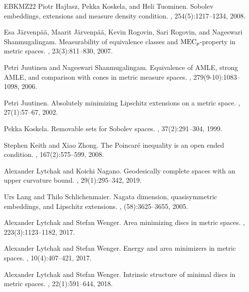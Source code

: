 \documentclass[reqno]{amsart}
\numberwithin{equation}{section}
\theoremstyle{remark}
\begin{document}
\begin{thebibliography}{EBKMZ22}
Piotr Haj\l{}asz, Pekka Koskela, and Heli Tuominen.
\newblock Sobolev embeddings, extensions and measure density condition.
, 254(5):1217--1234, 2008.

Esa J\"{a}rvenp\"{a}\"{a}, Maarit J\"{a}rvenp\"{a}\"{a}, Kevin Rogovin, Sari
  Rogovin, and Nageswari Shanmugalingam.
\newblock Measurability of equivalence classes and {${\rm MEC}_p$}-property in
  metric spaces.
, 23(3):811--830, 2007.

Petri Juutinen and Nageswari Shanmugalingam.
\newblock Equivalence of {AMLE}, strong {AMLE}, and comparison with cones in
  metric measure spaces.
, 279(9-10):1083--1098, 2006.

Petri Juutinen.
\newblock Absolutely minimizing {L}ipschitz extensions on a metric space.
, 27(1):57--67, 2002.

Pekka Koskela.
\newblock Removable sets for {S}obolev spaces.
, 37(2):291--304, 1999.

Stephen Keith and Xiao Zhong.
\newblock The {P}oincar\'{e} inequality is an open ended condition.
, 167(2):575--599, 2008.

Alexander Lytchak and Koichi Nagano.
\newblock Geodesically complete spaces with an upper curvature bound.
, 29(1):295--342, 2019.

Urs Lang and Thilo Schlichenmaier.
\newblock Nagata dimension, quasisymmetric embeddings, and {L}ipschitz
  extensions.
, (58):3625--3655, 2005.

Alexander Lytchak and Stefan Wenger.
\newblock Area minimizing discs in metric spaces.
, 223(3):1123--1182, 2017.

Alexander Lytchak and Stefan Wenger.
\newblock Energy and area minimizers in metric spaces.
, 10(4):407--421, 2017.

Alexander Lytchak and Stefan Wenger.
\newblock Intrinsic structure of minimal discs in metric spaces.
, 22(1):591--644, 2018.


\end{thebibliography}
\end{document}
